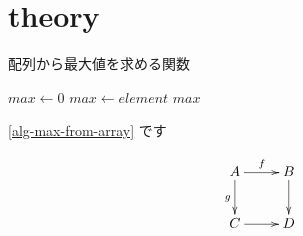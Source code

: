 \documentclass[uplatex, 10pt, a4paper, titlepage]{jsarticle}
\begin{document}
\makeatletter
\renewcommand{\ALG@name}{アルゴリズム}
\makeatother



\newpage

\newpage

\setcounter{tocdepth}{2}
\tableofcontents
\newpage

\listoftables
\listoffigures

\section{theory}

\begin{algorithm}[tb]
    \caption{配列から最大値を求める関数}
    \label{alg-max-from-array}
    \begin{algorithmic}[1]
        \State $max \gets 0$
        \State $max \gets element$
        \EndIf
        \EndFor
        \State \Return $max$
        \EndFunction
    \end{algorithmic}
\end{algorithm}

\ref{alg-max-from-array} です

\cite{vaswani2017attention}

$$
    \xymatrix{
        A \ar[r]^{f} \ar[d]_{g} & B \ar[d] \\
        C \ar[r] & D
    }
$$




\end{document}
